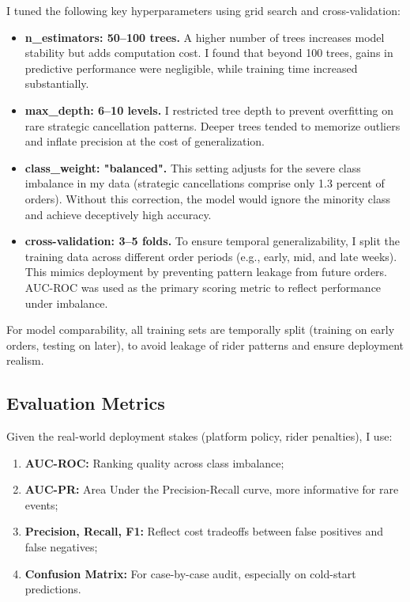 I tuned the following key hyperparameters using grid search and cross-validation:

\begin{itemize}
    \item \textbf{n\_estimators: 50--100 trees.}  
    A higher number of trees increases model stability but adds computation cost. I found that beyond 100 trees, gains in predictive performance were negligible, while training time increased substantially.

    \item \textbf{max\_depth: 6--10 levels.}  
    I restricted tree depth to prevent overfitting on rare strategic cancellation patterns. Deeper trees tended to memorize outliers and inflate precision at the cost of generalization.

    \item \textbf{class\_weight: "balanced".}  
    This setting adjusts for the severe class imbalance in my data (strategic cancellations comprise only 1.3 percent of orders). Without this correction, the model would ignore the minority class and achieve deceptively high accuracy.

    \item \textbf{cross-validation: 3--5 folds.}  
    To ensure temporal generalizability, I split the training data across different order periods (e.g., early, mid, and late weeks). This mimics deployment by preventing pattern leakage from future orders. AUC-ROC was used as the primary scoring metric to reflect performance under imbalance.
\end{itemize}

For model comparability, all training sets are temporally split (training on early orders, testing on later), to avoid leakage of rider patterns and ensure deployment realism.

\subsection{Evaluation Metrics}

Given the real-world deployment stakes (platform policy, rider penalties), I use:

\begin{enumerate}
    \item \textbf{AUC-ROC:} Ranking quality across class imbalance;
    \item \textbf{AUC-PR:} Area Under the Precision-Recall curve, more informative for rare events;
    \item \textbf{Precision, Recall, F1:} Reflect cost tradeoffs between false positives and false negatives;
    \item \textbf{Confusion Matrix:} For case-by-case audit, especially on cold-start predictions.
\end{enumerate}

